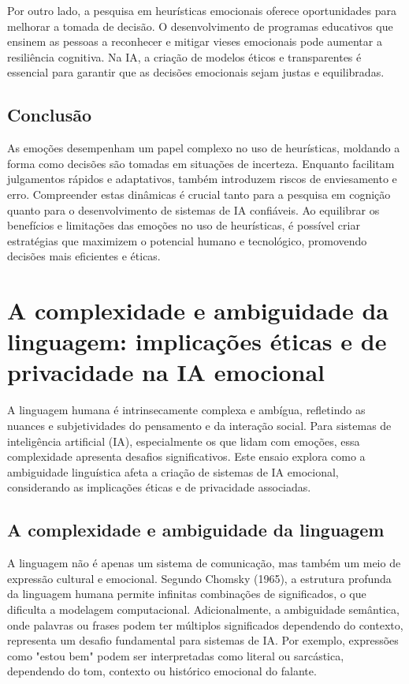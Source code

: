 \documentclass[a4paper,12pt]{report}
\begin{document}
	Por outro lado, a pesquisa em heurísticas emocionais oferece oportunidades para melhorar a tomada de decisão. O desenvolvimento de programas educativos que ensinem as pessoas a reconhecer e mitigar vieses emocionais pode aumentar a resiliência cognitiva. Na IA, a criação de modelos éticos e transparentes é essencial para garantir que as decisões emocionais sejam justas e equilibradas.
	
	\subsection{Conclusão}
	
	As emoções desempenham um papel complexo no uso de heurísticas, moldando a forma como decisões são tomadas em situações de incerteza. Enquanto facilitam julgamentos rápidos e adaptativos, também introduzem riscos de enviesamento e erro. Compreender estas dinâmicas é crucial tanto para a pesquisa em cognição quanto para o desenvolvimento de sistemas de IA confiáveis. Ao equilibrar os benefícios e limitações das emoções no uso de heurísticas, é possível criar estratégias que maximizem o potencial humano e tecnológico, promovendo decisões mais eficientes e éticas.
	
	
	\section{A complexidade e ambiguidade da linguagem: implicações éticas e de privacidade na IA emocional}
	
	A linguagem humana é intrinsecamente complexa e ambígua, refletindo as nuances e subjetividades do pensamento e da interação social. Para sistemas de inteligência artificial (IA), especialmente os que lidam com emoções, essa complexidade apresenta desafios significativos. Este ensaio explora como a ambiguidade linguística afeta a criação de sistemas de IA emocional, considerando as implicações éticas e de privacidade associadas.
	
	\subsection{A complexidade e ambiguidade da linguagem}
	
	A linguagem não é apenas um sistema de comunicação, mas também um meio de expressão cultural e emocional. Segundo Chomsky (1965), a estrutura profunda da linguagem humana permite infinitas combinações de significados, o que dificulta a modelagem computacional. Adicionalmente, a ambiguidade semântica, onde palavras ou frases podem ter múltiplos significados dependendo do contexto, representa um desafio fundamental para sistemas de IA. Por exemplo, expressões como "estou bem" podem ser interpretadas como literal ou sarcástica, dependendo do tom, contexto ou histórico emocional do falante.
	
\end{document}
